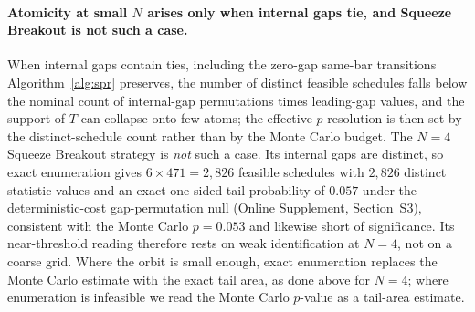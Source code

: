 \documentclass[risks,article,submit,pdftex,oneauthor]{Definitions/mdpi}
\begin{document}
\paragraph{Atomicity at small $N$ arises only when internal gaps tie, and Squeeze Breakout is not such a case.} When internal gaps contain ties, including the zero-gap same-bar transitions
Algorithm~\ref{alg:spr} preserves, the number of distinct feasible schedules falls
below the nominal count of internal-gap permutations times leading-gap values, and the
support of $T$ can collapse onto few atoms; the effective $p$-resolution is then set by
the distinct-schedule count rather than by the Monte Carlo budget. The $N=4$ Squeeze
Breakout strategy is \emph{not} such a case. Its internal gaps are distinct, so exact
enumeration gives $6\times471=2{,}826$ feasible schedules with $2{,}826$ distinct
statistic values and an exact one-sided tail probability of $0.057$ under the
deterministic-cost gap-permutation null (Online Supplement, Section~S3), consistent with
the Monte Carlo $p=0.053$ and likewise short of significance. Its near-threshold reading
therefore rests on weak identification at $N=4$, not on a coarse grid. Where the orbit is small enough, exact enumeration replaces the Monte Carlo estimate
with the exact tail area, as done above for $N=4$; where enumeration is infeasible we
read the Monte Carlo $p$-value as a tail-area estimate.
\end{document}
